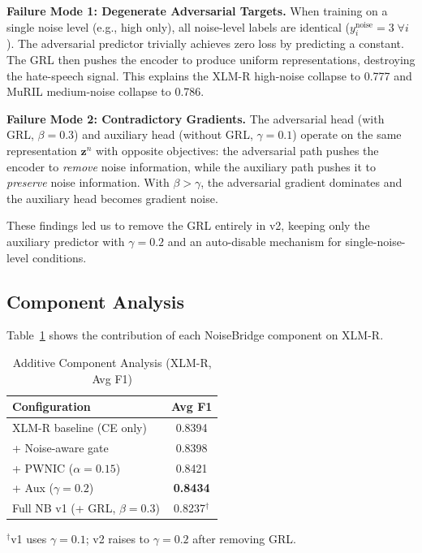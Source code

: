 \documentclass[conference]{IEEEtran}
\begin{document}
\textbf{Failure Mode 1: Degenerate Adversarial Targets.} When training on a single noise level (e.g., high only), all noise-level labels are identical ($y_i^\text{noise} = 3 \; \forall i$). The adversarial predictor trivially achieves zero loss by predicting a constant. The GRL then pushes the encoder to produce uniform representations, destroying the hate-speech signal. This explains the XLM-R high-noise collapse to 0.777 and MuRIL medium-noise collapse to 0.786.

\textbf{Failure Mode 2: Contradictory Gradients.} The adversarial head (with GRL, $\beta = 0.3$) and auxiliary head (without GRL, $\gamma = 0.1$) operate on the same representation $\mathbf{z}^n$ with opposite objectives: the adversarial path pushes the encoder to \textit{remove} noise information, while the auxiliary path pushes it to \textit{preserve} noise information. With $\beta > \gamma$, the adversarial gradient dominates and the auxiliary head becomes gradient noise.

These findings led us to remove the GRL entirely in v2, keeping only the auxiliary predictor with $\gamma = 0.2$ and an auto-disable mechanism for single-noise-level conditions.

\subsection{Component Analysis}

Table~\ref{tab:components} shows the contribution of each NoiseBridge component on XLM-R.

\begin{table}[H]
\caption{Additive Component Analysis (XLM-R, Avg F1)}
\label{tab:components}
\centering
\small
\begin{tabular}{lc}
\toprule
\textbf{Configuration} & \textbf{Avg F1} \\
\midrule
XLM-R baseline (CE only)              & 0.8394 \\
\quad + Noise-aware gate              & 0.8398 \\
\quad\quad + PWNIC ($\alpha = 0.15$)  & 0.8421 \\
\quad\quad\quad + Aux ($\gamma = 0.2$) & \textbf{0.8434} \\
\midrule
Full NB v1 (+ GRL, $\beta = 0.3$)    & 0.8237$^\dagger$ \\
\bottomrule
\end{tabular}
{\small $^\dagger$v1 uses $\gamma{=}0.1$; v2 raises to $\gamma{=}0.2$ after removing GRL.}
\end{table}
\end{document}
